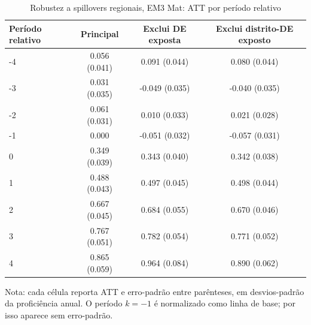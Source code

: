 \begin{table}[!htbp]
\centering
\caption{Robustez a spillovers regionais, EM3 Mat: ATT por período relativo}
\label{tab:ap_event_spillover_em3_mat}
\vspace{-0.15cm}
\scriptsize
\setlength{\tabcolsep}{4pt}
\renewcommand{\arraystretch}{0.92}
\begin{tabular}{lccc}
\toprule
Período relativo & Principal & Exclui DE exposta & Exclui distrito-DE exposto \\
\midrule
-4 & 0.056 (0.041) & 0.091 (0.044) & 0.080 (0.044) \\
-3 & 0.031 (0.035) & -0.049 (0.035) & -0.040 (0.035) \\
-2 & 0.061 (0.031) & 0.010 (0.033) & 0.021 (0.028) \\
-1 & 0.000 & -0.051 (0.032) & -0.057 (0.031) \\
0 & 0.349 (0.039) & 0.343 (0.040) & 0.342 (0.038) \\
1 & 0.488 (0.043) & 0.497 (0.045) & 0.498 (0.044) \\
2 & 0.667 (0.045) & 0.684 (0.055) & 0.670 (0.046) \\
3 & 0.767 (0.051) & 0.782 (0.054) & 0.771 (0.052) \\
4 & 0.865 (0.059) & 0.964 (0.084) & 0.890 (0.062) \\
\bottomrule
\end{tabular}
\begin{flushleft}
\footnotesize Nota: cada célula reporta ATT e erro-padrão entre parênteses, em desvios-padrão da proficiência anual. O período \(k=-1\) é normalizado como linha de base; por isso aparece sem erro-padrão.
\end{flushleft}
\end{table}
